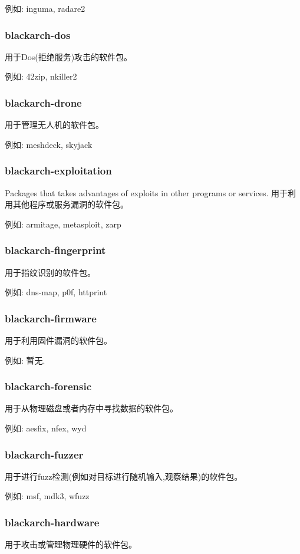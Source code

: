 \documentclass[a4paper, oneside, 11pt]{book}
\begin{document}
例如: inguma, radare2

\subsubsection{blackarch-dos}
用于Dos(拒绝服务)攻击的软件包。

例如: 42zip, nkiller2

\subsubsection{blackarch-drone}
用于管理无人机的软件包。

例如: meshdeck, skyjack

\subsubsection{blackarch-exploitation}
Packages that takes advantages of exploits in other programs or services.
用于利用其他程序或服务漏洞的软件包。

例如: armitage, metasploit, zarp

\subsubsection{blackarch-fingerprint}
用于指纹识别的软件包。

例如: dns-map, p0f, httprint

\subsubsection{blackarch-firmware}
用于利用固件漏洞的软件包。

例如: 暂无.

\subsubsection{blackarch-forensic}
用于从物理磁盘或者内存中寻找数据的软件包。

例如: aesfix, nfex, wyd

\subsubsection{blackarch-fuzzer}
用于进行fuzz检测(例如对目标进行随机输入,观察结果)的软件包。

例如: msf, mdk3, wfuzz

\subsubsection{blackarch-hardware}
用于攻击或管理物理硬件的软件包。
\end{document}
